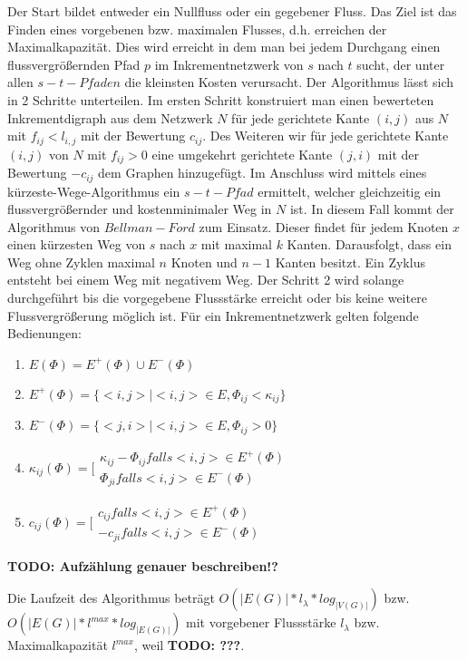 Der Start bildet entweder ein Nullfluss oder ein gegebener Fluss. Das Ziel 
ist das Finden eines vorgebenen bzw. maximalen Flusses, d.h. erreichen der 
Maximalkapazität. Dies wird erreicht in dem man bei jedem Durchgang einen 
flussvergrößernden Pfad $p$ im Inkrementnetzwerk von $s$ nach $t$ sucht, der
unter allen $s-t-Pfaden$ die kleinsten Kosten verursacht. Der Algorithmus 
lässt sich in 2 Schritte unterteilen. Im ersten Schritt konstruiert man einen 
bewerteten Inkrementdigraph aus dem Netzwerk $N$ für jede gerichtete Kante $(i,j)$ aus
$N$ mit $f_{ij} < l_{i,j}$ mit der Bewertung $c_{ij}$. Des Weiteren wir für jede 
gerichtete Kante $(i,j)$ von $N$ mit $f_{ij} > 0$ eine umgekehrt gerichtete Kante 
$(j,i)$ mit der Bewertung $-c_{ij}$ dem Graphen hinzugefügt. Im Anschluss 
wird mittels eines kürzeste-Wege-Algorithmus ein $s-t-Pfad$ ermittelt, 
welcher gleichzeitig ein flussvergrößernder und kostenminimaler Weg in $N$ 
ist. In diesem Fall kommt der Algorithmus von $Bellman-Ford$ zum Einsatz. Dieser 
findet für jedem Knoten $x$ einen kürzesten Weg von $s$ nach $x$ mit maximal $k$ 
Kanten. Darausfolgt, dass ein Weg ohne Zyklen maximal $n$ Knoten und $n-1$ Kanten 
besitzt. Ein Zyklus entsteht bei einem Weg mit negativem Weg. Der Schritt 2 wird 
solange durchgeführt bis die vorgegebene Flussstärke erreicht oder bis keine weitere 
Flussvergrößerung möglich ist. Für ein Inkrementnetzwerk gelten folgende Bedienungen:
\begin{enumerate}
 \item $E(\Phi)=E^+(\Phi)\cup E^-(\Phi)$
 \item $E^+(\Phi)=\{<i,j>|<i,j> \in E,\Phi_{ij} < \kappa_{ij}\}$
 \item $E^-(\Phi)=\{<j,i>|<i,j> \in E,\Phi_{ij} > 0\}$
 \item $\kappa_{ij}(\Phi)=\biggl[\begin{array}{ll}\kappa_{ij}-\Phi_{ij} 
 falls
 <i,j> \in E^+(\Phi) \\ \Phi_{ji} falls <i,j> \in E^-(\Phi) \end{array}$
 \item $c_{ij}(\Phi)=\biggl[\begin{array}{ll}c_{ij}falls<i,j> \in E^+(\Phi)
  \\ -c_{ji}falls<i,j> \in E^-(\Phi)\end{array}$
\end{enumerate}
\textbf{TODO: Aufzählung genauer beschreiben!?}

Die Laufzeit des Algorithmus beträgt $O(|E(G)| * l_\lambda * log_{|V(G)|})$ 
bzw. $O(|E(G)| * l^{max} * log_{|E(G)|})$ mit vorgebener Flussstärke 
$l_\lambda$ bzw. Maximalkapazität $l^{max}$, weil \textbf{TODO: ???}. 
\cite{kripfganz, optiv, tudortmund, bellford}